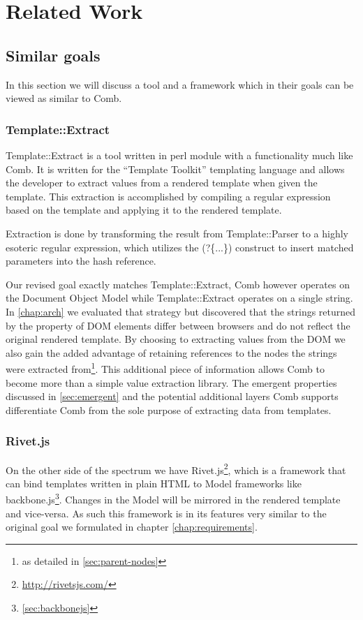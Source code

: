 \documentclass[thesis.tex]{subfiles}
\begin{document}
\chapter{Related Work}


\section{Similar goals}
In this section we will discuss a tool and a framework which in their goals
can be viewed as similar to Comb.

\subsection{Template::Extract}
Template::Extract\cite{TPLEXTRACT} is a tool written in perl module with a
functionality much like Comb. It is written for the ``Template Toolkit''
templating language and allows the developer to extract values from a rendered
template when given the template.
This extraction is accomplished by compiling a regular expression based on the
template and applying it to the rendered template.

\begin{citequote}{\cite{TPLEXTRACT}}
Extraction is done by transforming the result from Template::Parser to a highly
esoteric regular expression, which utilizes the (?\{...\}) construct to insert
matched parameters into the hash reference.
\end{citequote}

Our revised goal exactly matches Template::Extract, Comb however operates on the
Document Object Model while Template::Extract operates on a single string.
In \ref{chap:arch} we evaluated that strategy but discovered that the strings
returned by the  property of DOM elements differ between
browsers and do not reflect the original rendered template.
By choosing to extracting values from the DOM we also gain the added advantage
of retaining references to the nodes the strings were extracted from\footnote{
	as detailed in \ref{sec:parent-nodes}
}.
This additional piece of information allows Comb to become more than a simple
value extraction library. The emergent properties discussed in
\ref{sec:emergent} and the potential additional layers Comb supports
differentiate Comb from the sole purpose of extracting data from templates.

\subsection{Rivet.js}
On the other side of the spectrum we have Rivet.js\footnote{
\url{http://rivetsjs.com/}}, which is a framework that
can bind templates written in plain HTML to Model frameworks like
backbone.js\footnote{\ref{sec:backbonejs}}. Changes in the Model will be
mirrored in the rendered template and vice-versa.
As such this framework is in its features very similar to the original goal we
formulated in chapter \ref{chap:requirements}.
\end{document}
